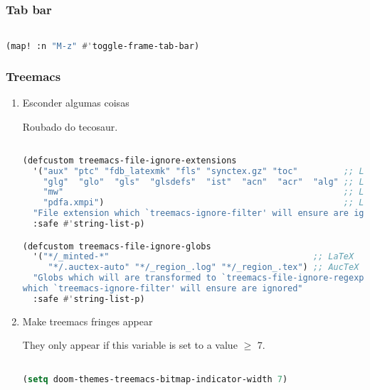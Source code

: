 \documentclass[11pt]{article}
\begin{document}
\subsubsection{Tab bar}
\label{sec:tab-bar}
\begin{lstlisting}[language=Lisp]%! Someone please complete this list for me

(map! :n "M-z" #'toggle-frame-tab-bar)
\end{lstlisting}

\subsubsection{Treemacs}
\label{sec:treemacs}


\begin{enumerate}
  \item Esconder algumas coisas
  \label{sec:esconder-algumas-coisas}

  Roubado do tecosaur.

\begin{lstlisting}[language=Lisp]%! Someone please complete this list for me

(defcustom treemacs-file-ignore-extensions
  '("aux" "ptc" "fdb_latexmk" "fls" "synctex.gz" "toc"         ;; LaTeX
    "glg"  "glo"  "gls"  "glsdefs"  "ist"  "acn"  "acr"  "alg" ;; LaTeX - glossary
    "mw"                                                       ;; LaTeX - pgfplots
    "pdfa.xmpi")                                               ;; LaTeX - pdfx
  "File extension which `treemacs-ignore-filter' will ensure are ignored"
  :safe #'string-list-p)

(defcustom treemacs-file-ignore-globs
  '("*/_minted-*"                                        ;; LaTeX
     "*/.auctex-auto" "*/_region_.log" "*/_region_.tex") ;; AucTeX
  "Globs which will are transformed to `treemacs-file-ignore-regexps'
which `treemacs-ignore-filter' will ensure are ignored"
  :safe #'string-list-p)
\end{lstlisting}
  \item Make treemacs fringes appear
  \label{sec:make-treemacs-fringes-appear}

  They only appear if this variable is set to a value \(\ge\) 7.

\begin{lstlisting}[language=Lisp]%! Someone please complete this list for me

(setq doom-themes-treemacs-bitmap-indicator-width 7)
\end{lstlisting}
\end{enumerate}
\end{document}
